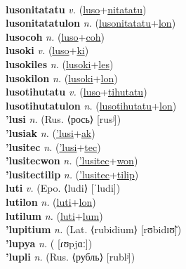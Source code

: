  \label{lusolyan} \\
\textbf{lusonitatatu} \textit{v.} (\hyperref[luso]{luso}+\hyperref[nitatatu]{nitatatu})
 \label{lusonitatatu} \\
\textbf{lusonitatatulon} \textit{n.} (\hyperref[lusonitatatu]{lusonitatatu}+\hyperref[lon]{lon})
 \label{lusonitatatulon} \\
\textbf{lusocoh} \textit{n.} (\hyperref[luso]{luso}+\hyperref[coh]{coh})
 \label{lusocoh} \\
\textbf{lusoki} \textit{v.} (\hyperref[luso]{luso}+\hyperref[ki]{ki})
 \label{lusoki} \\
\textbf{lusokiles} \textit{n.} (\hyperref[lusoki]{lusoki}+\hyperref[les]{les})
 \label{lusokiles} \\
\textbf{lusokilon} \textit{n.} (\hyperref[lusoki]{lusoki}+\hyperref[lon]{lon})
 \label{lusokilon} \\
\textbf{lusotihutatu} \textit{v.} (\hyperref[luso]{luso}+\hyperref[tihutatu]{tihutatu})
 \label{lusotihutatu} \\
\textbf{lusotihutatulon} \textit{n.} (\hyperref[lusotihutatu]{lusotihutatu}+\hyperref[lon]{lon})
 \label{lusotihutatulon} \\
\textbf{'lusi} \textit{n.} (Rus. ⟨рось⟩ [rusʲ])
 \label{'lusi} \\
\textbf{'lusiak} \textit{n.} (\hyperref['lusi]{'lusi}+\hyperref[ak]{ak})
 \label{'lusiak} \\
\textbf{'lusitec} \textit{n.} (\hyperref['lusi]{'lusi}+\hyperref[tec]{tec})
 \label{'lusitec} \\
\textbf{'lusitecwon} \textit{n.} (\hyperref['lusitec]{'lusitec}+\hyperref[won]{won})
 \label{'lusitecwon} \\
\textbf{'lusitectilip} \textit{n.} (\hyperref['lusitec]{'lusitec}+\hyperref[tilip]{tilip})
 \label{'lusitectilip} \\
\textbf{luti} \textit{v.} (Epo. ⟨ludi⟩ [ˈludi])
 \label{luti} \\
\textbf{lutilon} \textit{n.} (\hyperref[luti]{luti}+\hyperref[lon]{lon})
 \label{lutilon} \\
\textbf{lutilum} \textit{n.} (\hyperref[luti]{luti}+\hyperref[lum]{lum})
 \label{lutilum} \\
\textbf{'lupitium} \textit{n.} (Lat. ⟨rubidium⟩ [rʊbidɪʊ̃])
 \label{'lupitium} \\
\textbf{'lupya} \textit{n.} ( [ɾʊpjɑː])
 \label{'lupya} \\
\textbf{'lupli} \textit{n.} (Rus. ⟨рубль⟩ [rublʲ])
 \label{'lupli} \\
